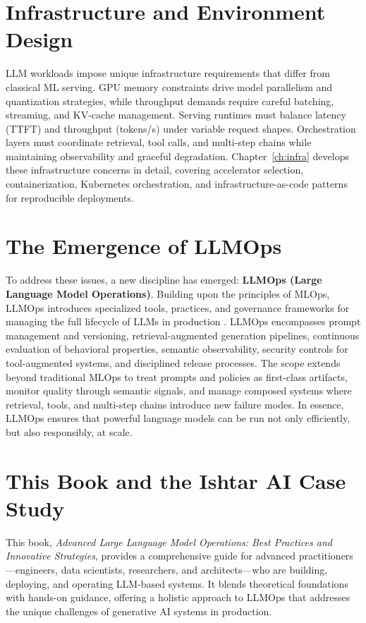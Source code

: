 \section{Infrastructure and Environment Design}

LLM workloads impose unique infrastructure requirements that differ from classical ML serving. GPU memory constraints drive model parallelism and quantization strategies, while throughput demands require careful batching, streaming, and KV-cache management. Serving runtimes must balance latency (TTFT) and throughput (tokens/s) under variable request shapes. Orchestration layers must coordinate retrieval, tool calls, and multi-step chains while maintaining observability and graceful degradation. Chapter~\ref{ch:infra} develops these infrastructure concerns in detail, covering accelerator selection, containerization, Kubernetes orchestration, and infrastructure-as-code patterns for reproducible deployments.

\section{The Emergence of LLMOps}
To address these issues, a new discipline has emerged: \textbf{LLMOps (Large Language Model Operations)}. Building upon the principles of MLOps, LLMOps introduces specialized tools, practices, and governance frameworks for managing the full lifecycle of LLMs in production \cite{mdpi}. LLMOps encompasses prompt management and versioning, retrieval-augmented generation pipelines, continuous evaluation of behavioral properties, semantic observability, security controls for tool-augmented systems, and disciplined release processes. The scope extends beyond traditional MLOps to treat prompts and policies as first-class artifacts, monitor quality through semantic signals, and manage composed systems where retrieval, tools, and multi-step chains introduce new failure modes. In essence, LLMOps ensures that powerful language models can be run not only efficiently, but also responsibly, at scale.

\section{This Book and the Ishtar AI Case Study}
This book, \emph{Advanced Large Language Model Operations: Best Practices and Innovative Strategies}, provides a comprehensive guide for advanced practitioners---engineers, data scientists, researchers, and architects---who are building, deploying, and operating LLM-based systems. It blends theoretical foundations with hands-on guidance, offering a holistic approach to LLMOps that addresses the unique challenges of generative AI systems in production.

